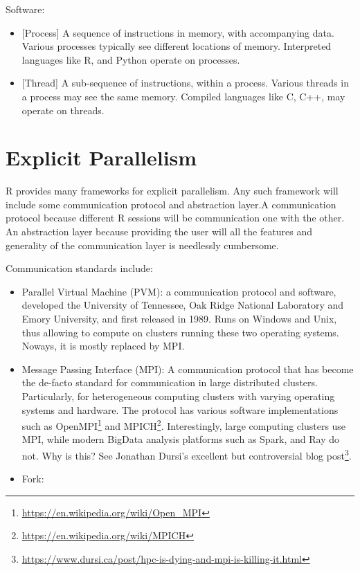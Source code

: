 \documentclass[]{book}
\providecommand{\tightlist}{%
  \setlength{\itemsep}{0pt}\setlength{\parskip}{0pt}}
\renewcommand{\href}[2]{#2\footnote{\url{#1}}}
\theoremstyle{definition}
\theoremstyle{definition}
\theoremstyle{definition}
\theoremstyle{remark}
\begin{document}
Software:

\begin{itemize}
\tightlist
\item
  {[}Process{]} A sequence of instructions in memory, with accompanying data. Various processes typically see different locations of memory. Interpreted languages like R, and Python operate on processes.
\item
  {[}Thread{]} A sub-sequence of instructions, within a process. Various threads in a process may see the same memory. Compiled languages like C, C++, may operate on threads.
\end{itemize}

\hypertarget{explicit-parallelism}{%
\section{Explicit Parallelism}\label{explicit-parallelism}}

R provides many frameworks for explicit parallelism.
Any such framework will include some communication protocol and abstraction layer.A communication protocol because different R sessions will be communication one with the other. An abstraction layer because providing the user will all the features and generality of the communication layer is needlessly cumbersome.

Communication standards include:

\begin{itemize}
\item
  Parallel Virtual Machine (PVM): a communication protocol and software, developed the University of Tennessee, Oak Ridge National Laboratory and Emory University, and first released in 1989. Runs on Windows and Unix, thus allowing to compute on clusters running these two operating systems. Noways, it is mostly replaced by MPI.
\item
  Message Passing Interface (MPI): A communication protocol that has become the de-facto standard for communication in large distributed clusters. Particularly, for heterogeneous computing clusters with varying operating systems and hardware. The protocol has various software implementations such as \href{https://en.wikipedia.org/wiki/Open_MPI}{OpenMPI} and \href{https://en.wikipedia.org/wiki/MPICH}{MPICH}. Interestingly, large computing clusters use MPI, while modern BigData analysis platforms such as Spark, and Ray do not. Why is this? See Jonathan Dursi's excellent but controversial \href{https://www.dursi.ca/post/hpc-is-dying-and-mpi-is-killing-it.html}{blog post}.
\item
  Fork:
\end{itemize}
\end{document}
